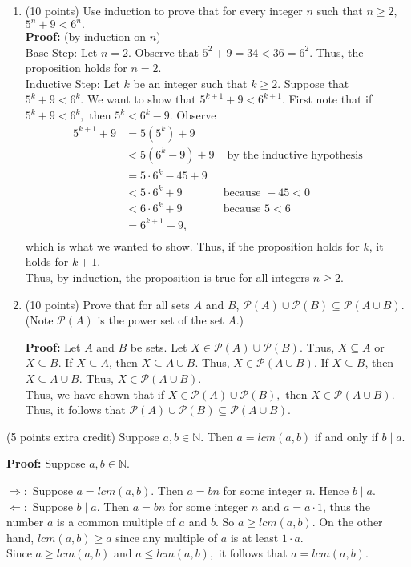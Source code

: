 \documentclass[11pt]{article}
\begin{document}
\begin{enumerate}
\newpage
\item (10 points) Use induction to prove that for every integer $n$ such that $n\geq2,$ $5^n+9 < 6^n.$\\

\textbf{Proof:} (by induction on $n$) \\
Base Step: Let $n=2.$ Observe that $5^2+9=34 < 36=6^2.$ Thus, the proposition holds for $n=2.$\\

Inductive Step: Let $k$ be an integer such that $k\geq 2.$ Suppose that $5^k+9 < 6^k.$ We want to show that $5^{k+1} +9 < 6^{k+1}.$ First note that if $5^k+9 < 6^k,$ then $5^k< 6^k-9.$ Observe
\begin{align*}
5^{k+1}+9&=5(5^k)+9&\\
&<5(6^k-9)+9& \text{ by the inductive hypothesis}\\
&=5\cdot 6^k-45+9&\\
&<5\cdot 6^k+9&\text{because }-45<0\\
&<6\cdot 6^k+9&\text{because }5<6\\
&=6^{k+1}+9,&\\
\end{align*}
which is what we wanted to show.
Thus, if the proposition holds for $k$, it holds for $k+1.$\\
Thus, by induction, the proposition is true for all integers $n \geq 2.$
\vfill
\newpage
\item (10 points) Prove that for all sets $A$ and $B$, $\mathcal{P}(A) \cup \mathcal{P}(B) \subseteq \mathcal{P}(A \cup B).$ (Note $\mathcal{P}(A)$ is the power set of the set $A.$)

\textbf{Proof:} Let $A$ and $B$ be sets. Let $X \in \mathcal{P}(A) \cup \mathcal{P}(B).$ Thus, $X \subseteq A$ or $X \subseteq B.$ If  $X \subseteq A$, then $X \subseteq A \cup B.$ Thus, $X \in \mathcal{P}(A \cup B).$ If  $X \subseteq B$, then $X \subseteq A \cup B.$ Thus, $X \in \mathcal{P}(A \cup B).$ \\
Thus, we have shown that if $X \in \mathcal{P}(A) \cup \mathcal{P}(B),$ then $X \in \mathcal{P}(A \cup B).$ Thus, it follows that $\mathcal{P}(A) \cup \mathcal{P}(B) \subseteq \mathcal{P}(A \cup B).$
\end{enumerate}
\vfill
(5 points extra credit) Suppose $a,b \in \mathbb{N}.$ Then $a=lcm(a,b)$ if and only if $b \mid a.$

\textbf{Proof:}  Suppose $a,b \in \mathbb{N}.$

$\Rightarrow:$ Suppose $a=lcm(a,b).$ Then $a=bn$ for some integer $n$. Hence $b \mid a.$\\

$\Leftarrow:$ Suppose $b \mid a.$ Then $a=bn$ for some integer $n$ and $a=a\cdot 1$, thus the number $a$ is a common multiple of $a$ and $b$. So $a \geq lcm(a,b).$ On the other hand, $lcm(a,b) \geq a$ since any multiple of $a$ is at least $1 \cdot a.$ \\

Since $a \geq lcm(a,b)$ and $a \leq lcm(a,b),$ it follows that $a=lcm(a,b).$
\end{document}
